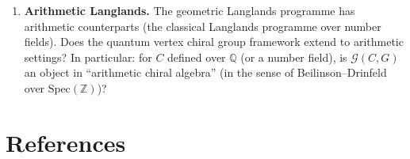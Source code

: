 \documentclass[11pt]{article}
\theoremstyle{definition}
\theoremstyle{remark}
\newcommand{\Spec}{\mathrm{Spec}}
\begin{document}
\begin{enumerate}[label=\textbf{OP\arabic*.}]
 \item \textbf{Arithmetic Langlands.} The geometric Langlands programme has arithmetic counterparts (the classical Langlands programme over number fields). Does the quantum vertex chiral group framework extend to arithmetic settings? In particular: for $C$ defined over $\mathbb{Q}$ (or a number field), is $\mathcal{G}(C, G)$ an object in ``arithmetic chiral algebra'' (in the sense of Beilinson--Drinfeld over $\Spec(\mathbb{Z})$)?
\end{enumerate}


\section*{References}
\end{document}
